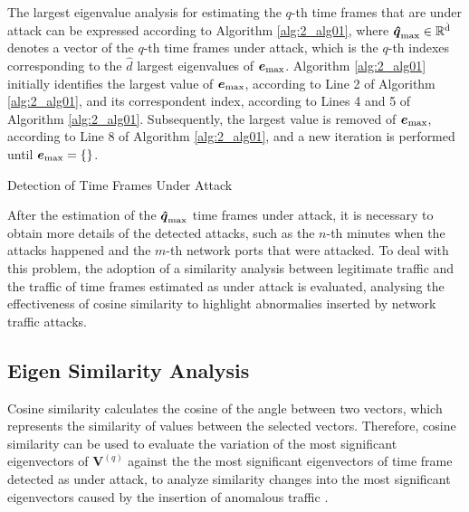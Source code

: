 The largest eigenvalue analysis for estimating the $q$-th time frames that are under attack can be expressed according to Algorithm \ref{alg:2_alg01}, where $\rm{\boldsymbol{\hat{q}}}_{\rm max} \in \mathbb{R}^{\hat{d}}$ denotes a vector of the $q$-th time frames under attack, which is the $q$-th indexes corresponding to the $\hat{d}$ largest eigenvalues of $\boldsymbol{e}_{\rm max}$. Algorithm \ref{alg:2_alg01} initially identifies the largest value of $\boldsymbol{e}_{\rm max}$, according to Line 2 of Algorithm \ref{alg:2_alg01}, and its correspondent index, according to Lines 4 and 5 of Algorithm \ref{alg:2_alg01}. Subsequently, the largest value is removed of $\boldsymbol{e}_{\rm max}$, according to Line 8 of Algorithm \ref{alg:2_alg01}, and a new iteration is performed until $\boldsymbol{e}_{\rm max} = \{\}$.

\begin{algorithm}[h!]
	\caption{Detection of Time Frames Under Attack}
  	\label{alg:2_alg01}
\end{algorithm}

After the estimation of the $\rm{\boldsymbol{\hat{q}}}_{\rm max}$ time frames under attack, it is necessary to obtain more details of the detected attacks, such as the $n$-th minutes when the attacks happened and the $m$-th network ports that were attacked. To deal with this problem, the adoption of a similarity analysis between legitimate traffic and the traffic of time frames estimated as under attack is evaluated, analysing the effectiveness of cosine similarity to highlight abnormalies inserted by network traffic attacks. 

\subsection{Eigen Similarity Analysis}
\label{sec:2_prop_EigenSimilarityAnalysis}

Cosine similarity calculates the cosine of the angle between two vectors, which represents the similarity of values between the selected vectors. Therefore, cosine similarity can be used to evaluate the variation of the most significant eigenvectors of $\boldsymbol{V}^{(q)}$ against the the most significant eigenvectors of time frame detected as under attack, to analyze similarity changes into the most significant eigenvectors caused by the insertion of anomalous traffic \cite{Lee2013}. 

